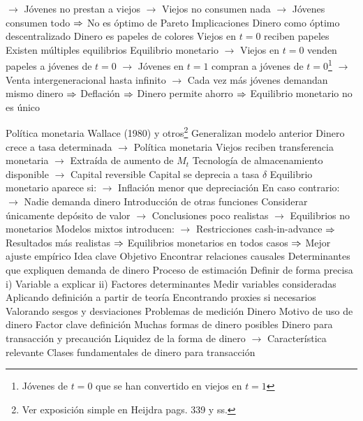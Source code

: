 \documentclass{nuevotema}
\begin{document}
\begin{esquemal}
				\4[] $\to$ Jóvenes no prestan a viejos
				\4[] $\to$ Viejos no consumen nada
				\4[] $\to$ Jóvenes consumen todo
				\4[] $\Rightarrow$ No es óptimo de Pareto
			\3 Implicaciones
				\4 Dinero como óptimo descentralizado
				\4[] Dinero es papeles de colores
				\4[] Viejos en $t=0$ reciben papeles
				\4[] Existen múltiples equilibrios
				\4[] Equilibrio monetario
				\4[] $\to$ Viejos en $t=0$ venden papeles a jóvenes de $t=0$
				\4[] $\to$ Jóvenes en $t=1$ compran a jóvenes de $t=0$\footnote{Jóvenes de $t=0$ que se han convertido en viejos en $t=1$}
				\4[] $\to$ Venta intergeneracional hasta infinito
				\4[] $\to$ Cada vez más jóvenes demandan mismo dinero
				\4[] $\Rightarrow$ Deflación
				\4[] $\Rightarrow$ Dinero permite ahorro
				\4[] $\Rightarrow$ Equilibrio monetario no es único

				\4 Política monetaria
				\4[] Wallace (1980) y otros\footnote{Ver exposición simple en Heijdra pags. 339 y ss.}
				\4[] Generalizan modelo anterior
				\4[] Dinero crece a tasa determinada
				\4[] $\to$ Política monetaria
				\4[] Viejos reciben transferencia monetaria
				\4[] $\to$ Extraída de aumento de $M_t$
				\4[] Tecnología de almacenamiento disponible
				\4[] $\to$ Capital reversible
				\4[] Capital se deprecia a tasa $\delta$
				\4[] Equilibrio monetario aparece si:
				\4[] $\to$ Inflación menor que depreciación
				\4[] En caso contrario:
				\4[] $\to$ Nadie demanda dinero
				\4 Introducción de otras funciones
				\4[] Considerar únicamente depósito de valor
				\4[] $\to$ Conclusiones poco realistas
				\4[] $\to$ Equilibrios no monetarios
				\4[] Modelos mixtos introducen:
				\4[] $\to$ Restricciones cash-in-advance
				\4[] $\Rightarrow$ Resultados más realistas
				\4[] $\Rightarrow$ Equilibrios monetarios en todos casos
				\4[] $\Rightarrow$ Mejor ajuste empírico
	\1 
		\2 Idea clave
			\3 Objetivo
				\4 Encontrar relaciones causales
				\4 Determinantes que expliquen demanda de dinero
			\3 Proceso de estimación
				\4[1] Definir de forma precisa
				\4[] i) Variable a explicar
				\4[] ii) Factores determinantes
				\4[2] Medir variables consideradas
				\4[] Aplicando definición a partir de teoría
				\4[] Encontrando proxies si necesarios
				\4[] Valorando sesgos y desviaciones
		\2 Problemas de medición
			\3 Dinero
				\4 Motivo de uso de dinero
				\4[] Factor clave definición
				\4[] Muchas formas de dinero posibles
				\4 Dinero para transacción y precaución
				\4[] Liquidez de la forma de dinero
				\4[] $\to$ Característica relevante
				\4[] Clases fundamentales de dinero para transacción

\end{esquemal}
\end{document}
